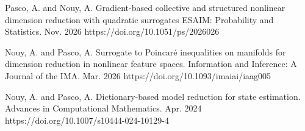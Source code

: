 

\begin{cvpublications}



\cvpublication
{Pasco, A. and Nouy, A.} %
{Gradient-based collective and structured nonlinear dimension reduction with quadratic surrogates} %
{ESAIM: Probability and Statistics.} %
{Nov. 2026} %
{https://doi.org/10.1051/ps/2026026} %



\cvpublication
{Nouy, A. and Pasco, A.} %
{Surrogate to Poincar\'e inequalities on manifolds for dimension reduction in nonlinear feature spaces.} %
{Information and Inference: A Journal of the IMA.} %
{Mar. 2026} %
{https://doi.org/10.1093/imaiai/iaag005} %


\cvpublication
{Nouy, A. and Pasco, A.} %
{Dictionary-based model reduction for state estimation.} %
{Advances in Computational Mathematics.} %
{Apr. 2024} %
{https://doi.org/10.1007/s10444-024-10129-4} %


\end{cvpublications}


